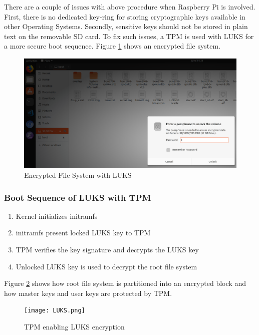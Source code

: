 \documentclass[11pt,openright]{report}
\begin{document}
There are a couple of issues with above procedure when Raspberry Pi is involved. First, there is no dedicated key-ring for storing cryptographic keys available in other Operating Systems. Secondly, sensitive keys should not be stored in plain text on the removable SD card. To fix such issues, a TPM is used with LUKS \cite{TPMLUKS} for a more secure boot sequence. Figure \ref{fig:encrypted_fs} shows an encrypted file system.

\begin{figure}
    \centering
    \includegraphics[scale=0.5]{images/2_LUKSEncryptedFormat.png}
    \caption{Encrypted File System with LUKS}
    \label{fig:encrypted_fs}
\end{figure}

\subsubsection{Boot Sequence of LUKS with TPM}
\renewcommand{\theenumi}{\roman{enumi}}%
\begin{enumerate}
	\item Kernel initializes initramfs
	\item initramfs present locked LUKS key to TPM
	\item TPM verifies the key signature and decrypts the LUKS key
	\item Unlocked LUKS key is used to decrypt the root file system
\end{enumerate}

Figure \ref{fig:tpmenableluks} shows how root file system is partitioned into an encrypted block and how master keys and user keys are protected by TPM.


\begin{figure}
	\centering
	\texttt{[image: LUKS.png]}
	\caption{TPM enabling LUKS encryption}
	\label{fig:tpmenableluks}
\end{figure}
\end{document}
